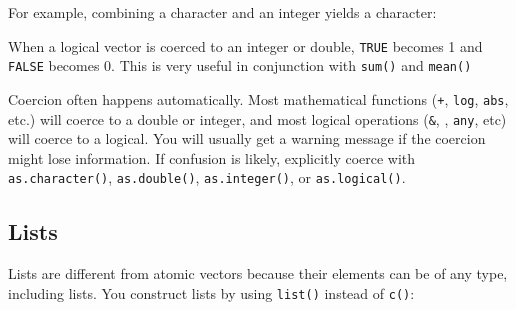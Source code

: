 For example, combining a character and an integer yields a character:

\begin{Shaded}
\begin{Highlighting}[]
\NormalTok{(}\NormalTok{(}\NormalTok{, }\NormalTok{))}
\end{Highlighting}
\end{Shaded}

When a logical vector is coerced to an integer or double, \texttt{TRUE}
becomes 1 and \texttt{FALSE} becomes 0. This is very useful in
conjunction with \texttt{sum()} and \texttt{mean()}

\begin{Shaded}
\begin{Highlighting}[]
\StringTok{ }\NormalTok{(}\NormalTok{, }\NormalTok{, }\NormalTok{)}


\end{Highlighting}
\end{Shaded}

Coercion often happens automatically. Most mathematical functions
(\texttt{+}, \texttt{log}, \texttt{abs}, etc.) will coerce to a double
or integer, and most logical operations (\texttt{\&},
\texttt{\textbar{}}, \texttt{any}, etc) will coerce to a logical. You
will usually get a warning message if the coercion might lose
information. If confusion is likely, explicitly coerce with
\texttt{as.character()}, \texttt{as.double()}, \texttt{as.integer()}, or
\texttt{as.logical()}.

\subsection{Lists}

Lists are different from atomic vectors because their elements can be of
any type, including lists. You construct lists by using \texttt{list()}
instead of \texttt{c()}:  

\begin{Shaded}
\begin{Highlighting}[]
\StringTok{ }\NormalTok{(}\NormalTok{:}\NormalTok{, }\NormalTok{, }\NormalTok{(}\NormalTok{, }\NormalTok{, }\NormalTok{), }\NormalTok{(}\NormalTok{, }\NormalTok{))}
\end{Highlighting}
\end{Shaded}

